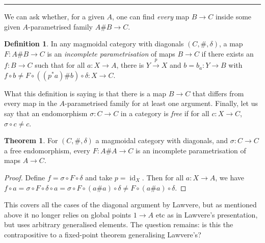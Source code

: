 \documentclass{tufte-handout}
\theoremstyle{definition}
\newtheorem*{definition}{Definition}
\newtheorem*{theorem}{Theorem}
\DeclareMathOperator{\id}{id}
\begin{document}
\hrule

\medskip

We can ask whether, for a given $A$, one can find \emph{every} map $B\to C$ inside some given $A$-parametrised family $A\# B \to C$.

\begin{definition}
In any magmoidal category with diagonals $(C,\#,\delta)$, a map $F\colon A\#B\to C$ is an \emph{incomplete parametrisation} of maps $B\to C$ if there exists an $f\colon B\to C$ such that for all $a\colon X\to A$, there is $Y\xrightarrow{p}X$ and $b = b_a\colon Y\to B$ with $f\circ b \not= F\circ((p^*a)\# b)\circ \delta\colon X\to C$.
\end{definition}

\noindent
What this definition is saying is that there is a map $B\to C$ that differs from every map in the $A$-parametrised family for at least one argument.
Finally, let us say that an endomorphism $\sigma\colon C\to C$ in a category is \emph{free} if for all $c\colon X\to C$, $\sigma\circ c \not=c$.

\begin{theorem}
  For $(C,\#,\delta)$ a magmoidal category with diagonals, and $\sigma \colon C\to C$ a free endomorphism, every $F\colon A\# A \to C$ is an incomplete parametrisation of maps $A\to C$.
\end{theorem}

\begin{proof}
  Define $f = \sigma\circ F\circ \delta$ and take $p=\id_X$. 
  Then for all $a\colon X\to A$, we have $f\circ a = \sigma \circ F\circ \delta \circ a= \sigma \circ F \circ (a\#a)\circ \delta \not=F\circ (a\#a)\circ \delta$.
\end{proof}

\noindent
This covers all the cases of the diagonal argument by Lawvere, but as mentioned above it no longer relies on global points $1\to A$ etc as in Lawvere's presentation, but uses arbitrary generalised elements. The question remains: is this the contrapositive to a fixed-point theorem generalising Lawvere's?
\end{document}
